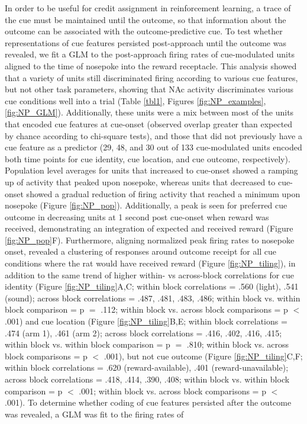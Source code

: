 \documentclass[11pt]{article}
\begin{document}
In order to be useful for credit assignment in reinforcement learning, a trace
of the cue must be maintained until the outcome, so that information about the
outcome can be associated with the outcome-predictive cue. To test whether
representations of cue features persisted post-approach until the outcome
was revealed, we fit a GLM to the post-approach firing rates of cue-modulated
units aligned to the time of nosepoke into the reward receptacle. This analysis
showed that a variety of units still discriminated firing according to various
cue features, but not other task parameters, showing that NAc activity
discriminates various cue conditions well into a trial (Table \ref{tbl1},
Figures \ref{fig:NP_examples},\ref{fig:NP_GLM}). Additionally, these units were
a mix between most of the units that encoded cue features at cue-onset (observed
overlap greater than expected by chance according to chi-square tests), and those
that did not previously have a cue feature as a predictor (29, 48, and 30 out of 133 cue-modulated units encoded both time points for cue identity, cue location, and cue outcome,
respectively). Population level averages for units that increased to
cue-onset showed a ramping up of activity that peaked upon nosepoke, whereas
units that decreased to cue-onset showed a gradual reduction of firing activity
that reached a minimum upon nosepoke (Figure \ref{fig:NP_pop}). Additionally, a
peak is seen for preferred cue outcome in decreasing units at 1 second post
cue-onset when reward was received, demonstrating an integration of expected and
received reward (Figure \ref{fig:NP_pop}F). Furthermore, aligning normalized
peak firing rates to nosepoke onset, revealed a clustering of responses around
outcome receipt for all cue conditions where the rat would have received reward
(Figure \ref{fig:NP_tiling}), in addition to the same trend of higher within- vs across-block correlations for cue identity (Figure \ref{fig:NP_tiling}A,C; within block correlations = .560 (light), .541 (sound); across block correlations = .487, .481, .483, .486; within block vs. within block comparison = p $=$ .112; within block vs. across block comparisons = p $<$ .001) and cue location (Figure \ref{fig:NP_tiling}B,E; within block correlations = .474 (arm 1), .461 (arm 2); across block correlations = .416, .402, .416, .415; within block vs. within block comparison = p $=$ .810; within block vs. across block comparisons = p $<$ .001), but not cue outcome (Figure \ref{fig:NP_tiling}C,F; within block correlations = .620 (reward-available), .401 (reward-unavailable); across block correlations = .418, .414, .390, .408; within block vs. within block comparison = p $<$ .001; within block vs. across block comparisons = p $<$ .001). To determine whether coding of cue features persisted after the outcome was revealed, a GLM was fit to the firing rates of
\end{document}
